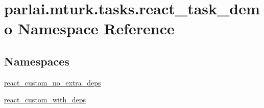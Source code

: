 \hypertarget{namespaceparlai_1_1mturk_1_1tasks_1_1react__task__demo}{}\section{parlai.\+mturk.\+tasks.\+react\+\_\+task\+\_\+demo Namespace Reference}
\label{namespaceparlai_1_1mturk_1_1tasks_1_1react__task__demo}
\subsection*{Namespaces}
\begin{DoxyCompactItemize}
\item 
 \hyperlink{namespaceparlai_1_1mturk_1_1tasks_1_1react__task__demo_1_1react__custom__no__extra__deps}{react\+\_\+custom\+\_\+no\+\_\+extra\+\_\+deps}
\item 
 \hyperlink{namespaceparlai_1_1mturk_1_1tasks_1_1react__task__demo_1_1react__custom__with__deps}{react\+\_\+custom\+\_\+with\+\_\+deps}
\end{DoxyCompactItemize}
